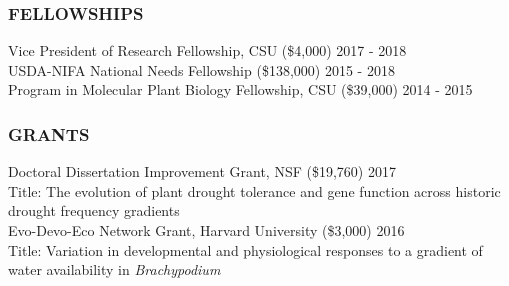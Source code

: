 \documentclass[12pt,english]{article}
\begin{document}
\subsubsection*{FELLOWSHIPS}
\vspace{-0.5ex}
\hspace*{1.0em} Vice President of Research Fellowship, CSU (\$4,000)
\hfill 
2017 - 2018
\vspace{1ex}\\
\hspace*{1.0em} USDA-NIFA National Needs Fellowship (\$138,000)
\hfill 
2015 - 2018
\vspace{1ex}\\
\hspace*{1.0em} Program in Molecular Plant Biology Fellowship, CSU (\$39,000)
\hfill 
2014 - 2015
\vspace{1ex}



\subsubsection*{GRANTS}
\vspace{-0.5ex}
\hspace*{1.0em} Doctoral Dissertation Improvement Grant, NSF (\$19,760)
\hfill 
2017\\
\hspace*{2.0em} Title: The evolution of plant drought tolerance and gene function across historic \hspace*{2.0em}drought frequency gradients 
\vspace{1ex}\\
\hspace*{1.0em} Evo-Devo-Eco Network Grant, Harvard University (\$3,000)
\hfill 
2016\\
\hspace*{2.0em} Title: Variation  in  developmental  and  physiological  responses  to  a  gradient  of  water  \hspace*{2.0em} availability in \textit{Brachypodium} 
\vspace{1ex}

\end{document}
